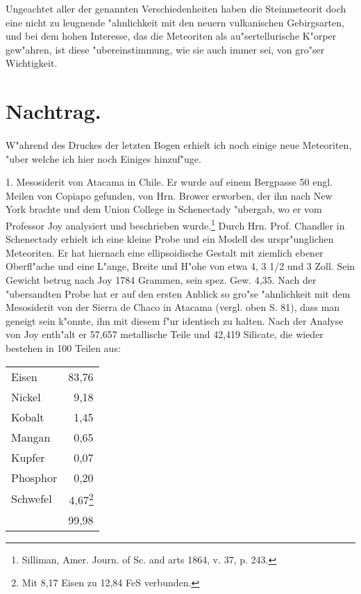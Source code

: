 \documentclass[a4paper, 11pt, oneside, german]{article}
\begin{document}
Ungeachtet aller der genannten Verschiedenheiten haben die Steinmeteorit doch eine nicht zu leugnende "ahnlichkeit mit den neuern vulkanischen Gebirgsarten, und bei dem hohen Interesse, das die Meteoriten als au"sertellurische K"orper gew"ahren, ist diese "ubereinstimmung, wie sie auch immer sei, von gro"ser Wichtigkeit.
\clearpage
\section{Nachtrag.}
\paragraph{}
W"ahrend des Druckes der letzten Bogen erhielt ich noch einige neue Meteoriten, "uber welche ich hier noch Einiges hinzuf"uge.

1. Mesosiderit von Atacama in Chile. Er wurde auf einem Bergpasse 50 engl. Meilen von Copiapo gefunden, von Hrn. Brower erworben, der ihn nach New York brachte und dem Union College in Schenectady "ubergab, wo er vom Professor Joy analysiert und beschrieben wurde.\footnote{Silliman, Amer. Journ. of Sc. and arts 1864, v. 37, p. 243.} Durch Hrn. Prof. Chandler in Schenectady erhielt ich eine kleine Probe und ein Modell des urspr"unglichen Meteoriten. Er hat hiernach eine ellipsoidische Gestalt mit ziemlich ebener Oberfl"ache und eine L"ange, Breite und H"ohe von etwa 4, 3 1/2 und 3 Zoll. Sein Gewicht betrug nach Joy 1784 Grammen, sein spez. Gew. 4,35. Nach der "ubersandten Probe hat er auf den ersten Anblick so gro"se "ahnlichkeit mit dem Mesosiderit von der Sierra de Chaco in Atacama (vergl. oben S. 81), dass man geneigt sein k"onnte, ihn mit diesem f"ur identisch zu halten. Nach der Analyse von Joy enth"alt er 57,657 metallische Teile und 42,419 Silicate, die wieder bestehen in 100 Teilen aus:
\begin{center}
\begin{tabular}{ l r }
    Eisen & 83,76\\
    Nickel & 9,18\\
    Kobalt & 1,45\\
    Mangan & 0,65\\
    Kupfer & 0,07\\
    Phosphor & 0,20\\
    Schwefel & 4,67\footnote{Mit 8,17 Eisen zu 12,84 FeS verbunden.}\\
     & 99,98\\
\end{tabular}
\end{center}
\end{document}
